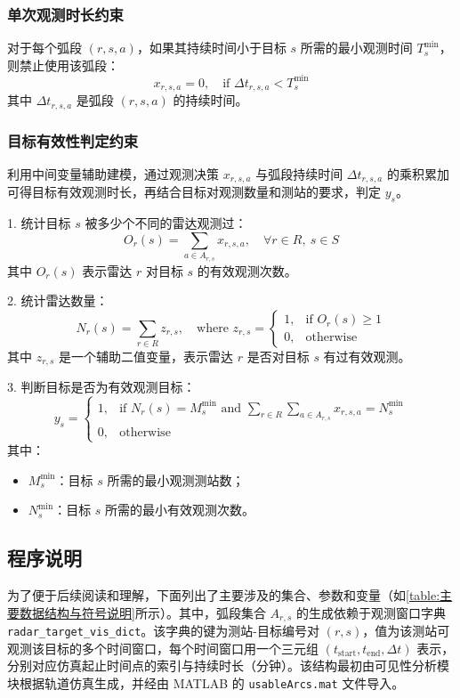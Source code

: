 \documentclass[openany,12pt,UTF8]{ctexart}
\begin{document}
\subsubsection{单次观测时长约束}
对于每个弧段 $(r, s, a)$，如果其持续时间小于目标 $s$ 所需的最小观测时间 $T_s^{\min}$，则禁止使用该弧段：
$$
    x_{r,s,a} = 0, \quad \text{if } \Delta t_{r,s,a} < T_s^{\min}
$$
其中 $\Delta t_{r,s,a}$ 是弧段 $(r, s, a)$ 的持续时间。

\subsubsection{目标有效性判定约束}
利用中间变量辅助建模，通过观测决策 $x_{r,s,a}$ 与弧段持续时间 $\Delta t_{r,s,a}$ 的乘积累加可得目标有效观测时长，再结合目标对观测数量和测站的要求，判定 $y_s$。

1. 统计目标 $s$ 被多少个不同的雷达观测过：
$$
    O_r(s) = \sum_{a \in A_{r,s}} x_{r,s,a}, \quad \forall r \in R,\ s \in S
$$
其中 $O_r(s)$ 表示雷达 $r$ 对目标 $s$ 的有效观测次数。

2. 统计雷达数量：
$$
    N_r(s) = \sum_{r \in R} z_{r,s}, \quad \text{where } z_{r,s} = 
    \begin{cases}
        1, & \text{if } O_r(s) \geq 1 \\
        0, & \text{otherwise}
    \end{cases}
$$
其中 $z_{r,s}$ 是一个辅助二值变量，表示雷达 $r$ 是否对目标 $s$ 有过有效观测。

3. 判断目标是否为有效观测目标：
$$
    y_s = 
    \begin{cases}
        1, & \text{if } N_r(s) = M_s^{\min} \text{ and } \sum_{r \in R} \sum_{a \in A_{r,s}} x_{r,s,a} = N_s^{\min} \\
        0, & \text{otherwise}
    \end{cases}
$$
其中：
\begin{itemize}
    \item $M_s^{\min}$：目标 $s$ 所需的最小观测测站数；
    \item $N_s^{\min}$：目标 $s$ 所需的最小有效观测次数。
\end{itemize}

\subsection{程序说明}
为了便于后续阅读和理解，下面列出了主要涉及的集合、参数和变量（如\autoref{table:主要数据结构与符号说明}所示）。其中，弧段集合 $A_{r,s}$ 的生成依赖于观测窗口字典 \texttt{radar\_target\_vis\_dict}。该字典的键为测站-目标编号对 $(r,s)$，值为该测站可观测该目标的多个时间窗口，每个时间窗口用一个三元组 $(t_{\text{start}}, t_{\text{end}}, \Delta t)$ 表示，分别对应仿真起止时间点的索引与持续时长（分钟）。该结构最初由可见性分析模块根据轨道仿真生成，并经由 MATLAB 的 \texttt{usableArcs.mat} 文件导入。
\end{document}

